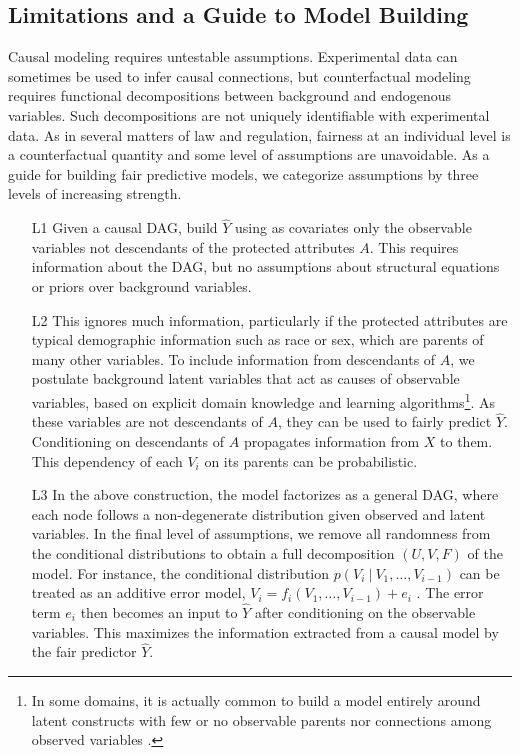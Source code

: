 \subsection{Limitations and a Guide to Model Building}
Causal modeling requires untestable assumptions. Experimental data can
sometimes be used to infer causal connections, but counterfactual
modeling requires functional
decompositions between background and endogenous variables.
Such decompositions are not
uniquely identifiable  with experimental data. As in several
matters of law and regulation, fairness at an individual level is a
counterfactual quantity and some level of assumptions
are unavoidable. As a guide for building fair predictive models, we
categorize assumptions by three levels of increasing strength.
%
\begin{itemize}
\item[L1] Given a causal DAG, build $\hat Y$
  using as covariates only the observable variables  not
  descendants of the protected attributes $A$. This
  requires information about the DAG, but no
  assumptions about structural equations or priors over background
  variables. %
\item[L2] This ignores much information, particularly if the protected
  attributes are typical demographic information such as race or sex, which are parents of many other variables. To
  include information from descendants of $A$, we postulate background
  latent variables that act as causes of observable variables, based
  on explicit domain knowledge and learning algorithms\footnote{In
    some domains, it is actually common to build a model entirely
    around latent constructs with few or no observable parents nor
    connections among observed variables \citep{bol:89}.}.  As these
  variables are not descendants of $A$, they can be used to fairly predict
  $\hat Y$.  Conditioning on descendants of $A$ propagates information
  from $X$ to them. This dependency of each $V_i$ on its parents can be
  probabilistic.%
 \item[L3] In the above construction, the model factorizes as a
   general DAG, where each node follows a non-degenerate
   distribution given observed and latent variables. In the final
   level of assumptions, we remove all randomness from the conditional
   distributions to obtain a full decomposition $(U, V, F)$ of the
   model. %
   For instance, the conditional distribution
   $p(V_i\ |\ V_1, \dots, V_{i - 1})$ can be treated as an additive
   error model, $V_i = f_i(V_1, \dots, V_{i - 1}) + e_i$
   \citep{peters:14}. The error term $e_i$  then becomes an input
   to $\hat Y$ after conditioning on the observable variables. This
   maximizes the information  extracted
   from a causal model by the fair predictor $\hat Y$.
\end{itemize}


